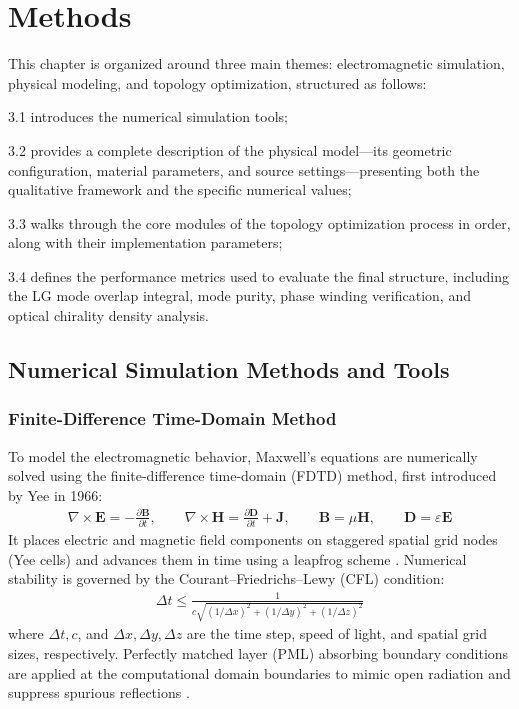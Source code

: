 \chapter{Methods}

\label{ch:Methods}

This chapter is organized around three main themes: electromagnetic simulation, physical modeling, and topology optimization, structured as follows:

3.1 introduces the numerical simulation tools;

3.2 provides a complete description of the physical model—its geometric configuration, material parameters, and source settings—presenting both the qualitative framework and the specific numerical values;

3.3 walks through the core modules of the topology optimization process in order, along with their implementation parameters;

3.4 defines the performance metrics used to evaluate the final structure, including the LG mode overlap integral, mode purity, phase winding verification, and optical chirality density analysis.


\section{Numerical Simulation Methods and Tools}

\subsection{Finite-Difference Time-Domain Method}

To model the electromagnetic behavior, Maxwell's equations are numerically solved using the finite-difference time-domain (FDTD) method, first introduced by Yee in 1966\cite{yee1966numerical}:
\begin{align}
\nabla \times \mathbf{E} = -\frac{\partial \mathbf{B}}{\partial t}, \qquad
\nabla \times \mathbf{H} = \frac{\partial \mathbf{D}}{\partial t} + \mathbf{J}, \qquad
\mathbf{B} = \mu \mathbf{H}, \qquad
\mathbf{D} = \varepsilon \mathbf{E}
\end{align}
It places electric and magnetic field components on staggered spatial grid nodes (Yee cells) and advances them in time using a leapfrog scheme . Numerical stability is governed by the Courant--Friedrichs--Lewy (CFL) condition:
\begin{align}
\Delta t \le \frac{1}{c\sqrt{(1/\Delta x)^2 + (1/\Delta y)^2 + (1/\Delta z)^2}}
\end{align}
where $\Delta t, c$, and $\Delta x, \Delta y, \Delta z$ are the time step, speed of light, and spatial grid sizes, respectively. Perfectly matched layer (PML) absorbing boundary conditions are applied at the computational domain boundaries to mimic open radiation and suppress spurious reflections \cite{berenger1994aperfecctly}.

